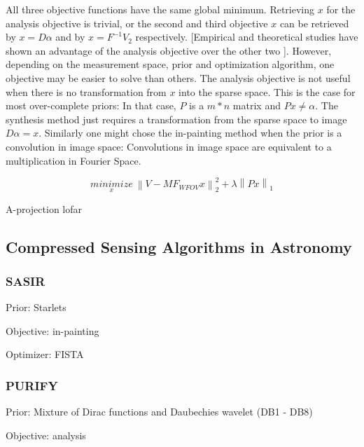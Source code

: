 All three objective functions have the same global minimum. Retrieving $x$ for the analysis objective is trivial, or the second and third objective $x$ can be retrieved by $x = D\alpha$ and by $x = F^{-1}V_2$ respectively. [Empirical and theoretical studies have shown an advantage of the analysis objective over the other two \cite{something}]. However, depending on the measurement space, prior and optimization algorithm, one objective may be easier to solve than others. The analysis objective is not useful when there is no transformation from $x$ into the sparse space. This is the case for most over-complete priors: In that case, $P$ is a $m*n$ matrix and  $Px \ne \alpha$. The synthesis method just requires a transformation from the sparse space to image $D\alpha = x$. Similarly one might chose the in-painting method when the prior is a convolution in image space: Convolutions in image space are equivalent to a multiplication in Fourier Space.


\begin{equation}\label{cs:eq:wfield}
	\underset{x}{minimize} \: \left \| V - MF_{WFOV} x \right \|_2^2 + \lambda \left \| Px\right \|_1
\end{equation}

A-projection lofar \cite{tasse2013applying}



\subsection{Compressed Sensing Algorithms in Astronomy}



\subsubsection{SASIR}
Prior: Starlets

Objective: in-painting

Optimizer: FISTA


\subsubsection{PURIFY}
Prior: Mixture of Dirac functions and Daubechies wavelet (DB1 - DB8)

Objective: analysis

